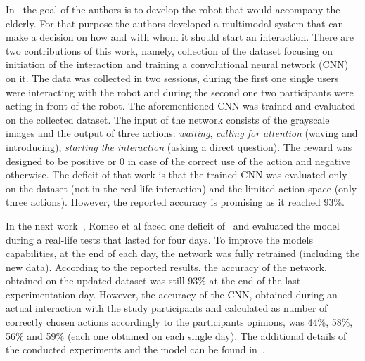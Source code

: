 \documentclass[thesis]{mas_proposal}
\begin{document}
In~\cite{Romeo2018} the goal of the authors is to develop the robot that would accompany the elderly. For that purpose the authors developed a multimodal system that can make a decision on how and with whom it should start an interaction. There are two contributions of this work, namely, collection of the dataset focusing on initiation of the interaction and training a convolutional neural network (CNN) on it. The data was collected in two sessions, during the first one single users were interacting with the robot and during the second one two participants were acting in front of the robot. The aforementioned CNN was trained and evaluated on the collected dataset. The input of the network consists of the grayscale images and the output of three actions: \emph{waiting}, \emph{calling for attention} (waving and introducing), \emph{starting the interaction} (asking a direct question). The reward  was designed to be positive or 0 in case of the correct use of the action and negative otherwise. The deficit of that work is that the trained CNN was evaluated only on the dataset (not in the real-life interaction) and the limited action space (only three actions). However, the reported accuracy is promising as it reached 93\%. 

In the next work~\cite{Romeo2018}, Romeo et al faced one deficit of~\cite{Romeo2018} and evaluated the model during a real-life tests that lasted for four days. To improve the models capabilities, at the end of each day, the network was fully retrained (including the new data). According to the reported results, the accuracy of the network, obtained on the updated dataset was still 93\% at the end of the last experimentation day. However, the accuracy of the CNN, obtained during an actual interaction with the study participants and calculated as number of correctly chosen actions accordingly to the participants opinions, was 44\%, 58\%, 56\% and 59\% (each one obtained on each single day). The additional details of the conducted experiments and the model can be found in~\cite{romeo2021human}.
\end{document}
